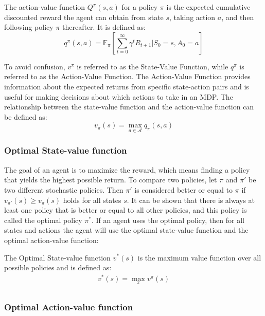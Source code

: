 \documentclass[../xlapes02]{subfiles}
\begin{document}
    \begin{definition}
        The action-value function $Q^{\pi}(s, a)$ for a policy $\pi$ is the expected cumulative discounted reward the agent can obtain from state $s$, taking action $a$, and then following policy $\pi$ thereafter. It is defined as:
        \[
            q^{\pi}(s, a) = \mathbb{E}_{\pi}\left[\sum_{t=0}^{\infty} \gamma^t R_{t+1} | S_0 = s, A_0 = a\right]
        \]
    \end{definition}

    To avoid confusion, $v^\pi$ is referred to as the State-Value Function, while $q^\pi$ is referred to as the Action-Value Function. The Action-Value Function provides information about the expected returns from specific state-action pairs and is useful for making decisions about which actions to take in an MDP. The relationship between the state-value function and the action-value function can be defined as:
    \[ v_\pi(s) = \max_{a\in\mathcal{A}} q_\pi(s, a) \]

    \subsubsection{Optimal State-value function}
    The goal of an agent is to maximize the reward, which means finding a policy that yields the highest possible return. To compare two policies, let $\pi$ and $\pi'$ be two different stochastic policies. Then $\pi'$ is considered better or equal to $\pi$ if $v_{\pi'}(s) \geq v_{\pi}(s)$ holds for all states $s$. It can be shown that there is always at least one policy that is better or equal to all other policies, and this policy is called the optimal policy $\pi^*$. If an agent uses the optimal policy, then for all states and actions the agent will use the optimal state-value function and the optimal action-value function:
    \begin{definition}
        The Optimal State-value function $v^*(s)$ is the maximum value function over all possible policies and is defined as:
        \begin{equation}
            \begin{split}
                v^*(s) = \max_{\pi} v^{\pi}(s) \\
            \end{split}
        \end{equation}
    \end{definition}

    \subsubsection{Optimal Action-value function}
\end{document}

